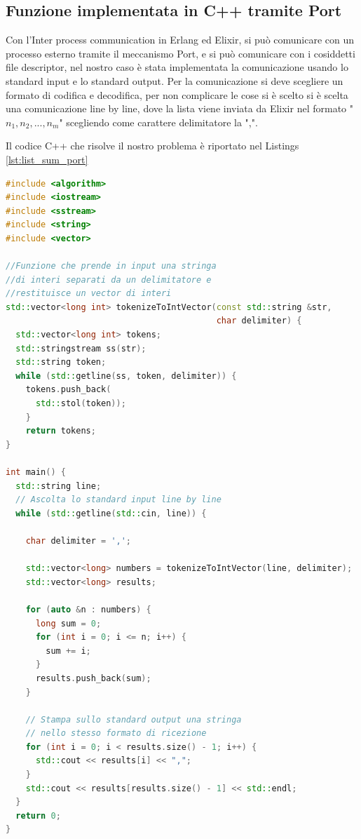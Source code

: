
\subsection{Funzione implementata in C++ tramite Port}

Con l'Inter process communication in Erlang ed Elixir, si può comunicare
con un processo esterno tramite il meccanismo Port, e si può comunicare con
i cosiddetti file descriptor, nel nostro caso è stata implementata la
comunicazione usando lo standard input e lo standard output. 
Per la comunicazione si deve scegliere un formato di codifica e decodifica, per non complicare le cose si è scelto
si è scelta una comunicazione line by line, dove la lista viene inviata
da Elixir nel formato "$n_{1},n_{2},...,n_{m}$" scegliendo come
carattere delimitatore la ",".

Il codice C++ che risolve il nostro problema è riportato nel Listings
\ref{lst:list_sum_port}

\begin{lstlisting}[language=cpp,captionpos=b,
	caption={Funzione list\_sum\_port()},
	label={lst:list_sum_port}]
#include <algorithm>
#include <iostream>
#include <sstream>
#include <string>
#include <vector>
	
//Funzione che prende in input una stringa
//di interi separati da un delimitatore e
//restituisce un vector di interi
std::vector<long int> tokenizeToIntVector(const std::string &str,
                                          char delimiter) {
  std::vector<long int> tokens;
  std::stringstream ss(str);
  std::string token;
  while (std::getline(ss, token, delimiter)) {
    tokens.push_back(
      std::stol(token));
	}
	return tokens;
}
	
int main() {
  std::string line;
  // Ascolta lo standard input line by line
  while (std::getline(std::cin, line)) {

    char delimiter = ',';

    std::vector<long> numbers = tokenizeToIntVector(line, delimiter);
    std::vector<long> results;

    for (auto &n : numbers) {
      long sum = 0;
      for (int i = 0; i <= n; i++) {
        sum += i;
      }
      results.push_back(sum);
    }

    // Stampa sullo standard output una stringa
    // nello stesso formato di ricezione
    for (int i = 0; i < results.size() - 1; i++) {
      std::cout << results[i] << ",";
    }
    std::cout << results[results.size() - 1] << std::endl;
  }
  return 0;
}

\end{lstlisting}

